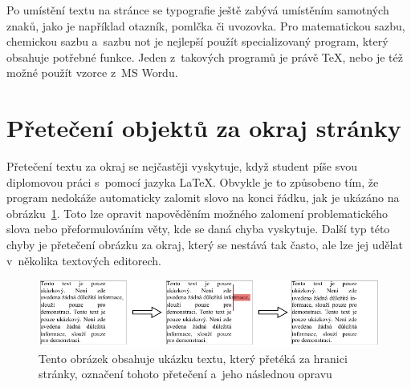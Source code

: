 Po umístění textu na stránce se typografie ještě zabývá umístěním samotných
znaků, jako je například otazník, pomlčka či uvozovka. Pro matematickou sazbu, 
chemickou sazbu a~sazbu not je nejlepší použít specializovaný program, 
který obsahuje potřebné funkce. Jeden z~takových programů je právě \TeX,
nebo je též možné použít vzorce z~MS Wordu.



\section{Přetečení objektů za okraj stránky}
Přetečení textu za okraj se nejčastěji vyskytuje, když student píše svou diplomovou
práci s~pomocí jazyka {\LaTeX}. Obvykle je to způsobeno tím, že program nedokáže
automaticky zalomit slovo na konci řádku, jak je ukázáno na
obrázku~\ref{pic_overflow}. Toto lze opravit napověděním možného
zalomení problematického slova nebo přeformulováním věty, kde se daná chyba vyskytuje.
Další typ této chyby je přetečení obrázku za okraj,
který se nestává tak často, ale lze jej udělat v~několika textových editorech.

\begin{figure}[H]
    \centering
    \includegraphics[width=\linewidth]{obrazky-figures/overflow_example.pdf}
    \caption{
        Tento obrázek obsahuje ukázku textu, který přetéká za hranici stránky,
        označení tohoto přetečení a~jeho následnou opravu
    }
    \label{pic_overflow}
\end{figure}


